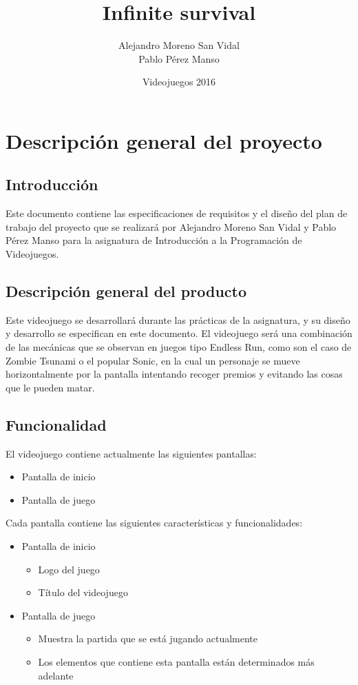 \documentclass[palatino]{apuntes}
\title{Infinite survival}
\author{Alejandro Moreno San Vidal \\ Pablo Pérez Manso}
\date{Videojuegos 2016}
\begin{document}
\pagestyle{plain}
\maketitle
\tableofcontents
\newpage

\chapter{Descripción general del proyecto}

\section{Introducción}
Este documento contiene las especificaciones de requisitos y el diseño del plan de trabajo del proyecto que se realizará por Alejandro Moreno San Vidal y Pablo Pérez Manso para la asignatura de Introducción a la Programación de Videojuegos.

\section{Descripción general del producto}
Este videojuego se desarrollará durante las prácticas de la asignatura, y su diseño y desarrollo se especifican en este documento. El videojuego será una combinación de las mecánicas que se observan en juegos tipo Endless Run, como son el caso de Zombie Tsunami o el popular Sonic, en la cual un personaje se mueve horizontalmente por la pantalla intentando recoger premios y evitando las cosas que le pueden matar.

\section{Funcionalidad}

El videojuego contiene actualmente las siguientes pantallas:
\begin{itemize}
    \item Pantalla de inicio
    \item Pantalla de juego
  
\end{itemize}

Cada pantalla contiene las siguientes características y funcionalidades:
\begin{itemize}
    \item Pantalla de inicio
        \begin{itemize}
            \item Logo del juego
            \item Título del videojuego
        \end{itemize}
   
    \item Pantalla de juego
        \begin{itemize}
            \item Muestra la partida que se está jugando actualmente
            \item Los elementos que contiene esta pantalla están determinados más adelante
        \end{itemize}
    
\end{itemize}
\end{document}
